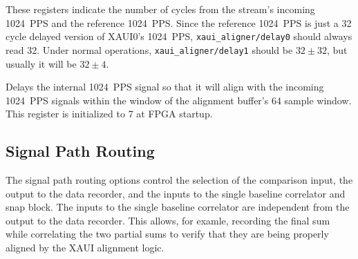 \documentclass[12pt]{article}
\begin{document}
\begin{description}
 These registers indicate the number of cycles
from the stream's incoming 1024~PPS and the reference 1024~PPS.  Since the
reference 1024~PPS is just a 32 cycle delayed version of XAUI0's 1024~PPS,
\verb|xaui_aligner/delay0| should always read 32.  Under normal operations,
\verb|xaui_aligner/delay1| should be $32\pm32$, but usually it will be
$32\pm4$.

 Delays the internal 1024~PPS signal so that it will align
with the incoming 1024~PPS signals within the window of the alignment buffer's
64 sample window.  This register is initialized to 7 at FPGA startup.

\end{description}

  \subsection{Signal Path Routing}

The signal path routing options control the selection of the comparison input,
the output to the data recorder, and the inputs to the single baseline
correlator and snap block.  The inputs to the single baseline correlator are
independent from the output to the data recorder.  This allows, for examle,
recording the final sum while correlating the two partial sums to verify that
they are being properly aligned by the XAUI alignment logic.
\end{document}
